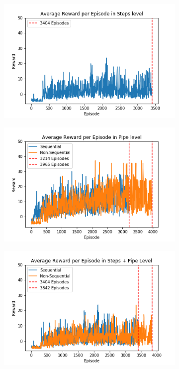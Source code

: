 \documentclass[notitlepage,a4paper,11pt]{article}
\begin{document}
\begin{figure}[t]
     \centering
     \begin{subfigure}[t]{0.32\textwidth}
         \centering
         \includegraphics[width=\textwidth]{figs/dqn_results_1.png}
         \caption{}
         \label{fig:dqn_results_1}
     \end{subfigure}
     \hfill
     \begin{subfigure}[t]{0.32\textwidth}
         \centering
         \includegraphics[width=\textwidth]{figs/dqn_results_2.png}
         \caption{}
         \label{fig:dqn_results_2}
     \end{subfigure}
     \hfill
     \begin{subfigure}[t]{0.32\textwidth}
         \centering
         \includegraphics[width=\textwidth]{figs/dqn_results_3.png}

\end{subfigure}
\end{figure}
\end{document}
